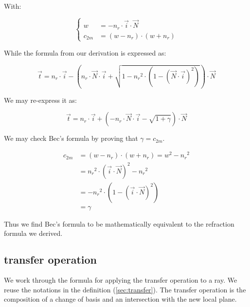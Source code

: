 With:

\begin{equation} \begin{cases}
w &= - n_r \cdot \overrightarrow{i} \cdot \overrightarrow{N} \\
c_{2m} &= (w - n_r) \cdot (w + n_r)
\end{cases} \end{equation}

While the formula from our derivation is expressed as:

\begin{equation}
\overrightarrow{t} = n_r \cdot \overrightarrow{i} -
\left(n_r \cdot \overrightarrow{N} \cdot \overrightarrow{i}
+ \sqrt{1 - {n_r}^2 \cdot \left(1 - 
             \left(\overrightarrow{N} \cdot \overrightarrow{i}\right)^2\right)}
\right)
\cdot \overrightarrow{N}
\end{equation}

We may re-express it as:

\begin{equation}
\overrightarrow{t} = n_r \cdot \overrightarrow{i} +
\left(- n_r \cdot \overrightarrow{N} \cdot \overrightarrow{i}
- \sqrt{1 + \gamma} \right) \cdot \overrightarrow{N}
\end{equation}

We may check Bec's formula by proving that $\gamma = c_{2m}$.

\begin{equation} \begin{split}
c_{2m} &= (w - n_r) \cdot (w + n_r) = w^2 - {n_r}^2 \\
       &= {n_r}^2 \cdot
          \left( \overrightarrow{i} \cdot \overrightarrow{N} \right)^2
          - {n_r}^2 \\
       &= -{n_r}^2 \cdot
           \left(1 - \left(\overrightarrow{i} \cdot
                     \overrightarrow{N}\right)^2\right) \\
       &= \gamma
\end{split} \end{equation}

Thus we find Bec's formula to be mathematically equivalent to the refraction
formula we derived.

\subsection{transfer operation}
We work through the formula for applying the transfer operation to a ray.
We reuse the notations in the definition (\cref{sec:transfer}). The transfer
operation is the composition of a change of basis and an intersection with
the new local plane.

